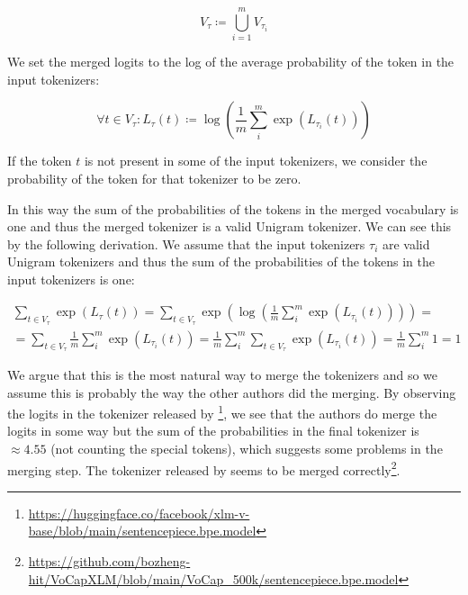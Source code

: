 \begin{equation}
    V_\tau \coloneqq \bigcup_{i=1}^m V_{\tau_i}
\end{equation}

We set the merged logits to the log of the average probability of the token in the input tokenizers:

\begin{equation}
    \forall t \in V_\tau: L_\tau(t) \coloneqq \log(\frac{1}{m} \sum_{i}^m \exp(L_{\tau_i}(t)))
\end{equation}

If the token $t$ is not present in some of the input tokenizers, we consider the probability of the token for that tokenizer to be zero. 

In this way the sum of the probabilities of the tokens in the merged vocabulary is one and thus the merged tokenizer is a valid Unigram tokenizer. We can see this by the following derivation. We assume that the input tokenizers $\tau_i$ are valid Unigram tokenizers and thus the sum of the probabilities of the tokens in the input tokenizers is one:

\begin{equation}
\begin{split}
    \sum_{t \in V_\tau} \exp(L_\tau(t)) = \sum_{t \in V_\tau} \exp(\log(\frac{1}{m} \sum_{i}^m \exp(L_{\tau_i}(t)))) = \\
    = \sum_{t \in V_\tau} \frac{1}{m} \sum_{i}^m \exp(L_{\tau_i}(t)) = \frac{1}{m} \sum_{i}^m \sum_{t \in V_\tau} \exp(L_{\tau_i}(t)) = \frac{1}{m} \sum_{i}^m 1 = 1
\end{split}
\end{equation}


We argue that this is the most natural way to merge the tokenizers and so we assume this is probably the way the other authors did the merging. By observing the logits in the tokenizer released by \citet{liang_xlm-v_2023}\footnote{\href{https://huggingface.co/facebook/xlm-v-base/blob/main/sentencepiece.bpe.model}{https://huggingface.co/facebook/xlm-v-base/blob/main/sentencepiece.bpe.model}}, we see that the authors do merge the logits in some way but the sum of the probabilities in the final tokenizer is $\approx 4.55$ (not counting the special tokens), which suggests some problems in the merging step. The tokenizer released by \citet{zheng_allocating_2021} seems to be merged correctly\footnote{\href{https://github.com/bozheng-hit/VoCapXLM/blob/main/VoCap\_500k/sentencepiece.bpe.model}{https://github.com/bozheng-hit/VoCapXLM/blob/main/VoCap\_500k/sentencepiece.bpe.model}}.

